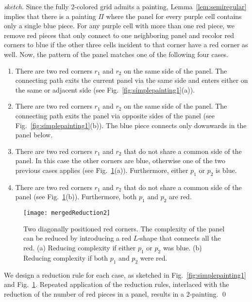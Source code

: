 \documentclass[runningheads]{llncs}
\begin{document}
\begin{proof}[sketch]
	Since the fully 2-colored grid admits a painting, Lemma~\ref{lem:semiregular} implies that there is a painting $\Pi$ where the panel for every purple cell contains only a single blue piece.
For any purple cell with more than one red piece, we remove red pieces that only connect to one neighboring panel and recolor red corners to blue if the other three cells incident to that corner have a red corner as well. Now, the pattern of the panel matches one of the following four cases.

	\begin{enumerate}
		\item There are two red corners $r_1$ and $r_2$ on the same side of the panel. The connecting path exits the current panel via the same side and enters either on the same or adjacent side (see Fig.~\ref{fig:simplepainting1}(a)).
		\item There are two red corners $r_1$ and $r_2$ on the same side of the panel. The connecting path exits the panel via opposite sides of the panel (see Fig.~\ref{fig:simplepainting1}(b)). The blue piece connects only downwards in the panel below.
        \item There are two red corners $r_1$ and $r_2$ that do not share a common side of the panel. In this case the other corners are blue, otherwise one of the two previous cases applies (see Fig.~\ref{fig:simplepainting3}(a)). Furthermore, either $p_1$ or $p_2$ is blue.
        \item There are two red corners $r_1$ and $r_2$ that do not share a common side of the panel (see Fig.~\ref{fig:simplepainting3}(b)). Furthermore, both $p_1$ and $p_2$ are red.
	\end{enumerate}	
		
	\begin{figure}[t]
			\centering
			\texttt{[image: mergedReduction2]}
		\caption{Two diagonally positioned red corners. The complexity of the panel can be reduced by introducing a red $L$-shape that connects all the red. (a) Reducing complexity if either $p_1$ or $p_2$ was blue. (b) Reducing complexity if both $p_1$ and $p_2$ were red.}
		\label{fig:simplepainting3}
	\end{figure}

We design a reduction rule for each case, as sketched in Fig.~\ref{fig:simplepainting1} and Fig.~\ref{fig:simplepainting3}. 
Repeated application of the reduction rules, interlaced with the reduction of the number of red pieces in a panel, results in a 2-painting.	
\hfill\qed
\end{proof}
\end{document}
